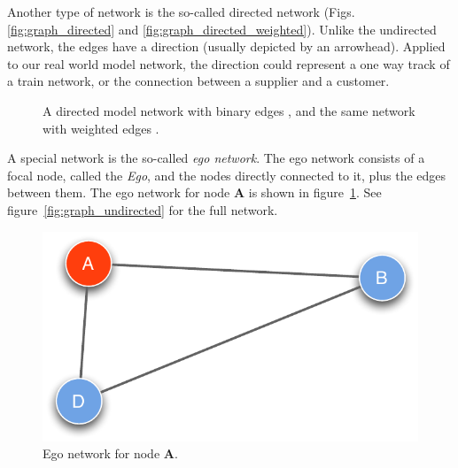 Another type of network is the so-called directed network (Figs.\ref{fig:graph_directed} and \ref{fig:graph_directed_weighted}). Unlike the undirected network, the edges have a direction (usually depicted by an arrowhead). Applied to our real world model network, the direction could represent a one way track of a train network, or the connection between a supplier and a customer.  

\begin{figure}[htpb]%
	\centering 
	\qquad 
	\caption[Directed model network with binary and weighted edges]{A directed model network with binary edges , and the same network with weighted edges .} 

\end{figure}

A special network is the so-called \textit{ego network}. The ego network consists of a focal node, called the \textit{Ego}, and the nodes directly connected to it, plus the edges between them. The ego network for node \textbf{A} is shown in figure~\ref{fig:graph_ego}. See figure~\ref{fig:graph_undirected} for the full network.

\begin{figure}[htbp]
\begin{center}
  \includegraphics[width=.45\textwidth]{assets/pdf/graph_egocentric.pdf}
  \caption[Ego network]{Ego network for node \textbf{A}.}
  \label{fig:graph_ego}
\end{center}
\end{figure}  

